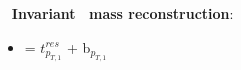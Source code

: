 {\begin{columns}[T]
\begin{column}{0.53\textwidth}
    \vspace{0.3cm}
    
    $\ \ $ \textbf{Invariant \PHpm~mass reconstruction}:
    \begin{itemize}
      \large
    \item[] \textcolor{kOrange}{\mHpmReco = $t^{res}_{p_{T,1}}$
      + b$_{p_{T,1}}$}
    \end{itemize}    
  \end{column}
  
  \begin{column}{0.41\textwidth}
    \vspace{-0.4cm}
  \end{column}
  \begin{column}{0.02\textwidth}\end{column}
\end{columns}
}

